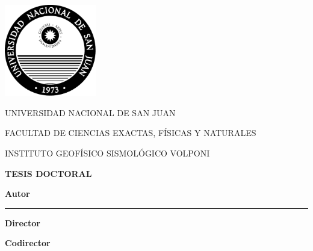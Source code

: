 \begin{titlepage}

    \begin{center}

        \includegraphics[height=4cm]{figs/logos/unsj.pdf}
        \vspace{1.5em}

        {\normalsize
        UNIVERSIDAD NACIONAL DE SAN JUAN
        }

        {\normalsize
        FACULTAD DE CIENCIAS EXACTAS, FÍSICAS Y NATURALES
        }

        {\normalsize
        INSTITUTO GEOFÍSICO SISMOLÓGICO VOLPONI
        }
        \vspace{3em}

        \textbf{\large TESIS DOCTORAL}
        \vspace{3em}

        \textbf{\LARGE \Title}

        \vspace{\fill}

        \textbf{\large Autor}
        \vspace{1em}

        {\large \LicSoler{}}
        \vspace{1em}

        \rule{\linewidth}{1pt}
        \vspace{1em}

        \begin{minipage}{0.45\linewidth}
            \raggedright
            \textbf{\large Director}
            \vspace{1em}

            {\large \Mario{}}
        \end{minipage}
        \begin{minipage}{0.45\linewidth}
            \raggedleft
            \textbf{\large Codirector}
            \vspace{1em}

            {\large \Leo{}}
        \end{minipage}

        \vspace{4em}

        {\normalsize{}}

    \end{center}

\end{titlepage}
